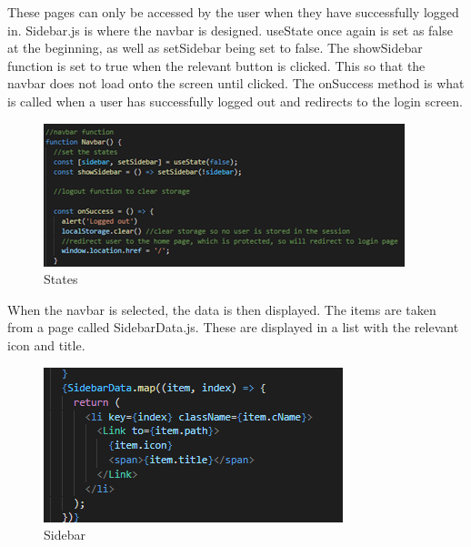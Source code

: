 These pages can only be accessed by the user when they have successfully logged in. Sidebar.js is where the navbar is designed. useState once again is set as false at the beginning, as well as setSidebar being set to false. The showSidebar function is set to true when the relevant button is clicked. This so that the navbar does not load onto the screen until clicked. The onSuccess method is what is called when a user has successfully logged out and redirects to the login screen. \\
\begin{figure}[H]
    \centering
    \includegraphics{img/nav3.png}
    \caption{States} 
    \label{fig:my_label}
\end{figure}

When the navbar is selected, the data is then displayed. The items are taken from a page called SidebarData.js. These are displayed in a list with the relevant icon and title. \\
\begin{figure}[H]
    \centering
    \includegraphics{img/nav4.png}
    \caption{Sidebar} 
    \label{fig:my_label}
\end{figure}

